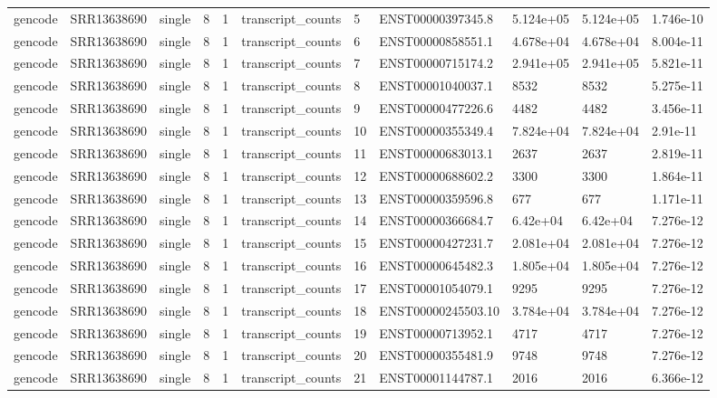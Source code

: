 \begin{tabular}{lllllllllll}
gencode & SRR13638690 & single & 8 & 1 & transcript\_counts & 5 & ENST00000397345.8 & 5.124e+05 & 5.124e+05 & 1.746e-10 \\
gencode & SRR13638690 & single & 8 & 1 & transcript\_counts & 6 & ENST00000858551.1 & 4.678e+04 & 4.678e+04 & 8.004e-11 \\
gencode & SRR13638690 & single & 8 & 1 & transcript\_counts & 7 & ENST00000715174.2 & 2.941e+05 & 2.941e+05 & 5.821e-11 \\
gencode & SRR13638690 & single & 8 & 1 & transcript\_counts & 8 & ENST00001040037.1 & 8532 & 8532 & 5.275e-11 \\
gencode & SRR13638690 & single & 8 & 1 & transcript\_counts & 9 & ENST00000477226.6 & 4482 & 4482 & 3.456e-11 \\
gencode & SRR13638690 & single & 8 & 1 & transcript\_counts & 10 & ENST00000355349.4 & 7.824e+04 & 7.824e+04 & 2.91e-11 \\
gencode & SRR13638690 & single & 8 & 1 & transcript\_counts & 11 & ENST00000683013.1 & 2637 & 2637 & 2.819e-11 \\
gencode & SRR13638690 & single & 8 & 1 & transcript\_counts & 12 & ENST00000688602.2 & 3300 & 3300 & 1.864e-11 \\
gencode & SRR13638690 & single & 8 & 1 & transcript\_counts & 13 & ENST00000359596.8 & 677 & 677 & 1.171e-11 \\
gencode & SRR13638690 & single & 8 & 1 & transcript\_counts & 14 & ENST00000366684.7 & 6.42e+04 & 6.42e+04 & 7.276e-12 \\
gencode & SRR13638690 & single & 8 & 1 & transcript\_counts & 15 & ENST00000427231.7 & 2.081e+04 & 2.081e+04 & 7.276e-12 \\
gencode & SRR13638690 & single & 8 & 1 & transcript\_counts & 16 & ENST00000645482.3 & 1.805e+04 & 1.805e+04 & 7.276e-12 \\
gencode & SRR13638690 & single & 8 & 1 & transcript\_counts & 17 & ENST00001054079.1 & 9295 & 9295 & 7.276e-12 \\
gencode & SRR13638690 & single & 8 & 1 & transcript\_counts & 18 & ENST00000245503.10 & 3.784e+04 & 3.784e+04 & 7.276e-12 \\
gencode & SRR13638690 & single & 8 & 1 & transcript\_counts & 19 & ENST00000713952.1 & 4717 & 4717 & 7.276e-12 \\
gencode & SRR13638690 & single & 8 & 1 & transcript\_counts & 20 & ENST00000355481.9 & 9748 & 9748 & 7.276e-12 \\
gencode & SRR13638690 & single & 8 & 1 & transcript\_counts & 21 & ENST00001144787.1 & 2016 & 2016 & 6.366e-12 \\

\end{tabular}
